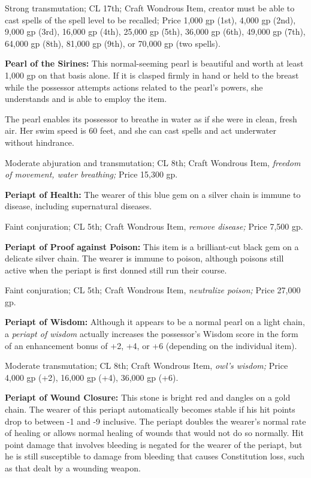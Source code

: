 \documentclass{article}
\begin{document}
Strong transmutation; CL 17th; Craft Wondrous Item, creator must be able to cast 
spells of the spell level to be recalled; Price 1,000 gp (1st), 4,000 gp (2nd), 
9,000 gp (3rd), 16,000 gp (4th), 25,000 gp (5th), 36,000 gp (6th), 49,000 gp (7th), 
64,000 gp (8th), 81,000 gp (9th), or 70,000 gp (two spells).

\textbf{Pearl of the Sirines: }This normal-seeming pearl is beautiful and worth 
at least 1,000 gp on that basis alone. If it is clasped firmly in hand or held 
to the breast while the possessor attempts actions related to the pearl's powers, 
she understands and is able to employ the item.

The pearl enables its possessor to breathe in water as if she were in clean, fresh 
air. Her swim speed is 60 feet, and she can cast spells and act underwater without 
hindrance.

Moderate abjuration and transmutation; CL 8th; Craft Wondrous Item, \textit{freedom 
of movement, water breathing; }Price 15,300 gp.

\textbf{Periapt of Health:} The wearer of this blue gem on a silver chain is immune 
to disease, including supernatural diseases.

Faint conjuration; CL 5th; Craft Wondrous Item, \textit{remove disease; }Price 
7,500 gp.

\textbf{Periapt of Proof against Poison: }This item is a brilliant-cut black gem 
on a delicate silver chain. The wearer is immune to poison, although poisons still 
active when the periapt is first donned still run their course.

Faint conjuration; CL 5th; Craft Wondrous Item, \textit{neutralize poison; }Price 
27,000 gp.

\textbf{Periapt of Wisdom:} Although it appears to be a normal pearl on a light 
chain, a \textit{periapt of wisdom }actually increases the possessor's Wisdom score 
in the form of an enhancement bonus of +2, +4, or +6 (depending on the individual 
item).

Moderate transmutation; CL 8th; Craft Wondrous Item, \textit{owl's wisdom; }Price 
4,000 gp (+2), 16,000 gp (+4), 36,000 gp (+6).

\textbf{Periapt of Wound Closure:} This stone is bright red and dangles on a gold 
chain. The wearer of this periapt automatically becomes stable if his hit points 
drop to between -1 and -9 inclusive. The periapt doubles the wearer's normal rate 
of healing or allows normal healing of wounds that would not do so normally. Hit 
point damage that involves bleeding is negated for the wearer of the periapt, but 
he is still susceptible to damage from bleeding that causes Constitution loss, 
such as that dealt by a wounding weapon.
\end{document}
